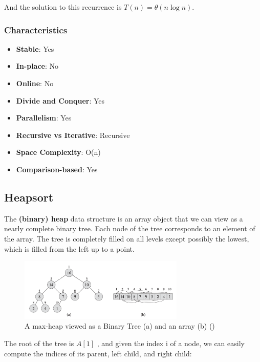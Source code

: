 And the solution to this recurrence is $T(n) = \theta(n \log n)$.

\subsubsection*{Characteristics}

\begin{itemize}
    \item \textbf{Stable}: Yes
    \item \textbf{In-place}: No
    \item \textbf{Online}: No
    \item \textbf{Divide and Conquer}: Yes
    \item \textbf{Parallelism}: Yes
    \item \textbf{Recursive vs Iterative}: Recursive
    \item \textbf{Space Complexity}: O(n)
    \item \textbf{Comparison-based}: Yes
\end{itemize}



\subsection{Heapsort}

The \textbf{(binary) heap} data structure is an array object that we can view as a nearly complete binary tree. Each node of the tree corresponds to an element of the array. The tree is completely filled on all levels except possibly the lowest, which is filled from the left up to a point.

\begin{figure}[H]
    \centering
    \includegraphics[width=0.7\textwidth]{assets/heap.png}
    \caption{A max-heap viewed as a Binary Tree (a) and an array (b) (\cite{cormen2022introduction})}
\end{figure}

The root of the tree is $A[1]$ , and given the index i of a node, we
can easily compute the indices of its parent, left child, and right child:

